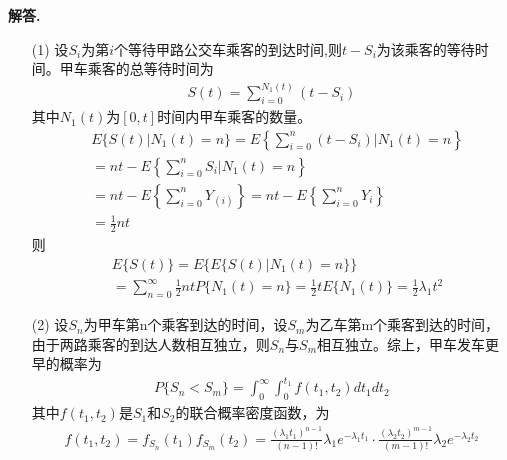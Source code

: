 \documentclass[12pt, a4paper, oneside]{ctexart}
\newenvironment{solution}{\par\noindent\textbf{解答. }}{\par}
\begin{document}
\begin{solution}
    \begin{itemize}
    \item [(1)]
    设$S_i$为第$i$个等待甲路公交车乘客的到达时间,则$t-S_i$为该乘客的等待时间。甲车乘客的总等待时间为
    \begin{align*}
        S(t)=\sum_{i=0}^{N_1(t)}{
            (t-S_i)
        }
    \end{align*}
    其中$N_1(t)$为$[0,t]$时间内甲车乘客的数量。
    \begin{align*}
        & E\{
            S(t) \big | N_1(t)=n
        \}
        = 
        E\left\{
            \sum_{i=0}^{n}{
            (t-S_i)
            } 
            \big | 
            N_1(t)=n
        \right\}
        \\
        & =
        nt-E\left\{
            \sum_{i=0}^{n}{
                S_i
            } 
            \big | 
            N_1(t)=n
        \right\}
        \\
        & =
        nt-E\left\{
            \sum_{i=0}^{n}{
                Y_{(i)}
            } 
        \right\}
        =
        nt-E\left\{
            \sum_{i=0}^{n}{
                Y_i
            } 
        \right\}
        \\
        & = \frac{1}{2}nt
    \end{align*}
    则
    \begin{align*}
        &E\{S(t)\} = E\{E\{
            S(t) \big | N_1(t)=n
        \}\}
    \\
    & = 
    \sum_{n=0}^{\infty}{
        \frac{1}{2}nt 
        P\{
            N_1(t)=n
        \}
    }
    =\frac{1}{2}t
    E\{
        N_1(t)  
    \}
    =\frac{1}{2} \lambda_1 t^2
    \end{align*}
    \item[(2)] 设$S_n$为甲车第n个乘客到达的时间，设$S_m$为乙车第m个乘客到达的时间，由于两路乘客的到达人数相互独立，则$S_n$与$S_m$相互独立。综上，甲车发车更早的概率为
    \begin{align*}
        P\{S_n<S_m\}
        =
        \int_{0}^{\infty}{
            \int_{0}^{t_1}{
                f(t_1,t_2)
                dt_1dt_2
            }
        }
    \end{align*}
    其中$f(t_1,t_2)$是$S_1$和$S_2$的联合概率密度函数，为
    \begin{align*}
        f(t_1,t_2) = f_{S_n}(t_1) f_{S_m}(t_2)=
        \frac{\left(\lambda_{1} t_{1}\right)^{n-1}}{(n-1) !} \lambda_{1} e^{-\lambda_{1} t_{1}} \cdot \frac{\left(\lambda_{2} t_{2}\right)^{m-1}}{(m-1) !} \lambda_{2} e^{-\lambda_{2} t_{2}}
    \end{align*}
    \end{itemize}
\end{solution}
\end{document}
